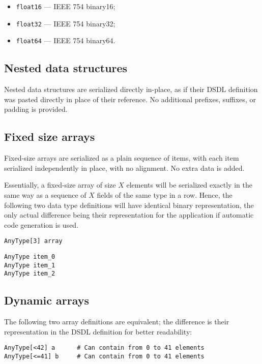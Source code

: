 \begin{itemize}
    \item \verb|float16| --- IEEE 754 binary16;
    \item \verb|float32| --- IEEE 754 binary32;
    \item \verb|float64| --- IEEE 754 binary64.
\end{itemize}

\subsection{Nested data structures}

Nested data structures are serialized directly in-place,
as if their DSDL definition was pasted directly in place of their reference.
No additional prefixes, suffixes, or padding is provided.

\subsection{Fixed size arrays}

Fixed-size arrays are serialized as a plain sequence of items,
with each item serialized independently in place, with no alignment.
No extra data is added.

Essentially, a fixed-size array of size $X$ elements will be serialized exactly in the same way
as a sequence of $X$ fields of the same type in a row.
Hence, the following two data type definitions will have identical binary representation,
the only actual difference being their representation for the application
if automatic code generation is used.

\begin{verbatim}
AnyType[3] array
\end{verbatim}

\begin{verbatim}
AnyType item_0
AnyType item_1
AnyType item_2
\end{verbatim}

\subsection{Dynamic arrays}

The following two array definitions are equivalent;
the difference is their representation in the DSDL definition for better readability:
\begin{verbatim}
AnyType[<42] a      # Can contain from 0 to 41 elements
AnyType[<=41] b     # Can contain from 0 to 41 elements
\end{verbatim}

